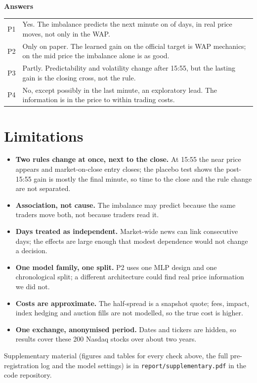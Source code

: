 \documentclass[10pt,a4paper,twocolumn]{article}
\newcommand{\minihead}[1]{\par\needspace{8\baselineskip}\smallskip\textbf{#1}\par}
\newcommand{\code}[1]{\texttt{#1}}
\begin{document}
\minihead{Answers}
{\footnotesize
\begin{tabularx}{\linewidth}{@{}L{0.7cm} Y@{}}
\toprule
P1 & Yes. The imbalance predicts the next minute on \nOnePositiveDays{} of \nDays{} days, in real price moves, not
only in the WAP. \\
P2 & Only on paper. The learned gain on the official target is WAP mechanics; on the mid price the imbalance alone
is as good. \\
P3 & Partly. Predictability and volatility change after 15:55, but the lasting gain is the closing cross, not the
rule. \\
P4 & No, except possibly in the last minute, an exploratory lead. The information is in the price to within trading
costs. \\
\bottomrule
\end{tabularx}}

\section{Limitations}

\begin{itemize}
  \item \textbf{Two rules change at once, next to the close.} At 15:55 the near price appears and market-on-close
  entry closes; the placebo test shows the post-15:55 gain is mostly the final minute, so time to the close and the
  rule change are not separated.
  \item \textbf{Association, not cause.} The imbalance may predict because the same traders move both, not because
  traders read it.
  \item \textbf{Days treated as independent.} Market-wide news can link consecutive days; the effects are large
  enough that modest dependence would not change a decision.
  \item \textbf{One model family, one split.} P2 uses one MLP design and one chronological split; a different
  architecture could find real price information we did not.
  \item \textbf{Costs are approximate.} The half-spread is a snapshot quote; fees, impact, index hedging and auction
  fills are not modelled, so the true cost is higher.
  \item \textbf{One exchange, anonymised period.} Dates and tickers are hidden, so results cover these 200 Nasdaq
  stocks over about two years.
\end{itemize}

Supplementary material (figures and tables for every check above, the full pre-registration log and the model
settings) is in \code{report/supplementary.pdf} in the code repository.
\end{document}
